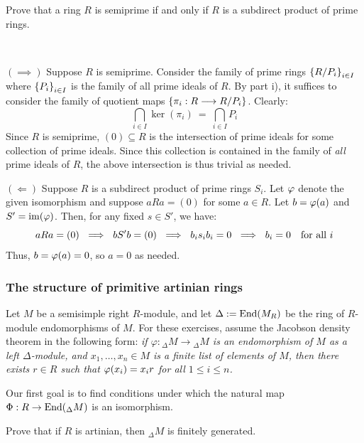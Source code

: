 \newpage
\begin{exr}
	Prove that a ring $R$ is semiprime if and only if $R$ is a
	subdirect product of prime rings.
\end{exr} \

\begin{pf}
	$(\implies)$ Suppose $R$ is semiprime.
	Consider the family of prime rings $\left\{{R/P_{i}}\right\}_{i\in I}$ where
	$\left\{{P_{i}}\right\}_{i\in I}$ is the family of all prime ideals of $R$.
	By part i), it suffices to consider the family of quotient maps
	$\left\{{\pi_{i}:R\longrightarrow R/P_{i}}\right\}$. Clearly:
	\begin{equation*}
		\bigcap_{i\in I}\ker(\pi_{i}) \ = \ \bigcap_{i\in I}P_{i}
	\end{equation*}
	Since $R$ is semiprime, $(0)\subseteq R$ is the intersection of prime
	ideals for some collection of prime ideals.
	Since this collection is contained in the family of \textit{all} prime ideals
	of $R$, the above intersection is thus trivial as needed.

	$(\Longleftarrow)$ Suppose $R$ is a subdirect product of prime rings $S_{i}$.
	Let $\varphi$ denote the given isomorphism and suppose $aRa=(0)$
	for some $a\in R$. Let $b=\varphi(a)$ and $S'=\operatorname{im}(\varphi)$.
	Then, for any fixed $s \in S'$, we have:
	\begin{equation*}
		aRa=(0) \ \implies \ bS'b=(0) \ \implies \ b_{i}s_{i}b_{i}=0 \ \implies \ b_{i}=0 \quad
		\trm{for all } i
	\end{equation*}
	Thus, $b=\varphi(a)=0$, so $a=0$ as needed.
\end{pf}


\nq
\subsubsection*{The structure of primitive artinian rings}
Let $M$ be a semisimple right $R$-module, and let
$\Delta:=\operatorname{End}(M_R)$ be the ring of $R$-module endomorphisms of $M$.
For these exercises, assume the Jacobson density theorem in the following form:
\textit{if $\varphi:{_\Delta}M\rightarrow {_\Delta}M$ is an endomorphism of $M$ as a left $\Delta$-module, and $x_1,\dots,x_n\in M$ is a finite list of elements of $M$, then there exists $r\in R$ such that $\varphi(x_i)=x_ir$ for all $1\leq i\leq n$.}

\begin{exr}
	Our first goal is to find conditions under which the natural map $\Phi:R\rightarrow \operatorname{End}({_\Delta}M)$ is an isomorphism.

	Prove that if $R$ is artinian, then $_{\Delta}M$ is finitely generated.
\end{exr} \


